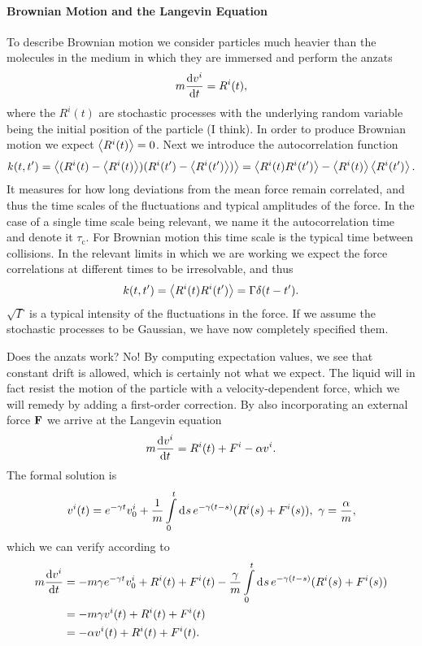 \paragraph{Brownian Motion and the Langevin Equation}
To describe Brownian motion we consider particles much heavier than the molecules in the medium in which they are immersed and perform the anzats
\begin{align*}
	m\dv{v^{i}}{t} = R^{i}(t),
\end{align*}
where the $R^{i}(t)$ are stochastic processes with the underlying random variable being the initial position of the particle (I think). In order to produce Brownian motion we expect $\expval{R^{i}(t)} = 0$. Next we introduce the autocorrelation function
\begin{align*}
	k(t, t^{\prime}) = \expval{(R^{i}(t) - \expval{R^{i}(t)})(R^{i}(t\ensuremath{^{\prime}}) - \expval{R^{i}(t\ensuremath{^{\prime}})})} = \expval{R^{i}(t)R^{i}(t\ensuremath{^{\prime}})} - \expval{R^{i}(t)}\expval{R^{i}(t\ensuremath{^{\prime}})}.
\end{align*}
It measures for how long deviations from the mean force remain correlated, and thus the time scales of the fluctuations and typical amplitudes of the force. In the case of a single time scale being relevant, we name it the autocorrelation time and denote it $\tau_{\text{c}}$. For Brownian motion this time scale is the typical time between collisions. In the relevant limits in which we are working we expect the force correlations at different times to be irresolvable, and thus
\begin{align*}
	k(t, t^{\prime}) = \expval{R^{i}(t)R^{i}(t\ensuremath{^{\prime}})} = \Gamma\delta(t - t^{\prime}).
\end{align*}
$\sqrt{\Gamma}$ is a typical intensity of the fluctuations in the force. If we assume the stochastic processes to be Gaussian, we have now completely specified them.

Does the anzats work? No! By computing expectation values, we see that constant drift is allowed, which is certainly not what we expect. The liquid will in fact resist the motion of the particle with a velocity-dependent force, which we will remedy by adding a first-order correction. By also incorporating an external force $\vb{F}$ we arrive at the Langevin equation
\begin{align*}
	m\dv{v^{i}}{t} = R^{i}(t) + F^{i} - \alpha v^{i}.
\end{align*}
The formal solution is
\begin{align*}
	v^{i}(t) = e^{-\gamma t}v^{i}_{0} + \frac{1}{m}\integ{0}{t}{s}{e^{-\gamma(t - s)}(R^{i}(s) + F^{i}(s))},\ \gamma = \frac{\alpha}{m},
\end{align*}
which we can verify according to
\begin{align*}
	m\dv{v^{i}}{t} &= -m\gamma e^{-\gamma t}v^{i}_{0} + R^{i}(t) + F^{i}(t) - \frac{\gamma}{m}\int\limits_{0}^{t}\dd[]{s}e^{-\gamma(t - s)}(R^{i}(s) + F^{i}(s)) \\
	               &= -m\gamma v^{i}(t) + R^{i}(t) + F^{i}(t) \\
	               &= -\alpha v^{i}(t) + R^{i}(t) + F^{i}(t).
\end{align*}

